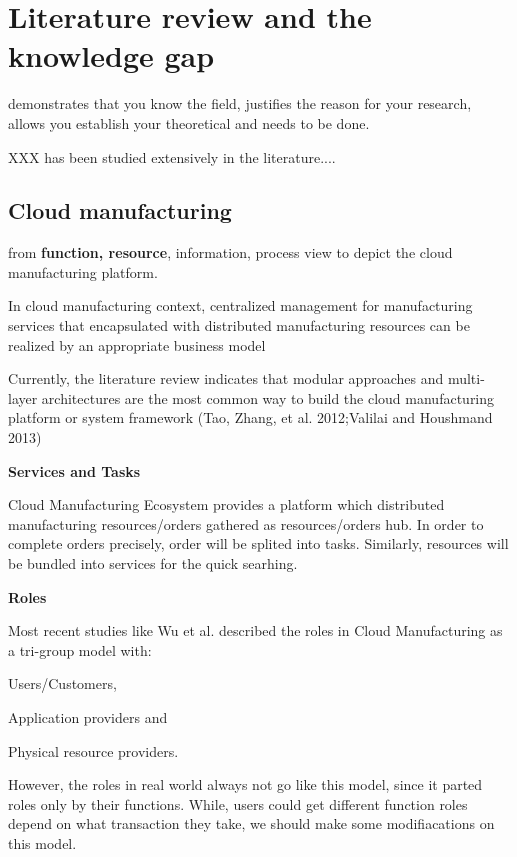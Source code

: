 \section{Literature review and the knowledge gap} %
\label{sec:literature_review}
demonstrates that you know the field, justifies the reason for your research, allows you establish your theoretical and needs to be done.


XXX has been studied extensively in the literature....
\subsection{Cloud manufacturing} %
\label{sub:cloud_manufacturing review}
from \textbf{function, resource}, information, process view to depict the cloud manufacturing platform.

In cloud manufacturing context, centralized management for manufacturing services that encapsulated with distributed manufacturing resources can be realized by an appropriate business model\cite{Xu2012}

Currently, the literature review indicates that modular approaches and multi-layer architectures are the most common way to build the cloud manufacturing platform or system framework (Tao, Zhang, et al. 2012;Valilai and Houshmand 2013)

\textbf{Services and Tasks}

Cloud Manufacturing Ecosystem provides a platform which distributed manufacturing resources/orders gathered as resources/orders hub. In order to complete orders precisely, order will be splited into tasks. Similarly, resources will be bundled into services for the quick searhing.

\textbf{Roles}

Most recent studies like Wu et al.\cite{Wu2013} described the roles in Cloud Manufacturing as a tri-group model with:\begin{inparaenum}[1)]
\item Users/Customers,
\item Application providers and
\item Physical resource providers.
\end{inparaenum}
However, the roles in real world always not go like this model, since it parted roles only by their functions. While, users could get different function roles depend on what transaction they take, we should make some modifiacations on this model.



